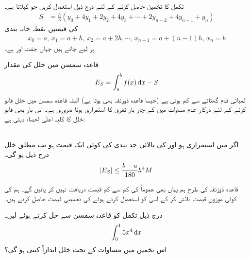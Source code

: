 \\
تکمل  کا تخمین حاصل کرنے کے لئے درج ذیل استعمال کریں جو   کہلاتا ہے۔ 
\begin{align}\label{مساوات_تکمل_قاعدہ_سمسن}
S&=\frac{h}{3}(y_0+4y_1+2y_2+4y_3+\cdots+2y_{n-2}+4y_{n-1}+y_n)
\end{align}
 کی قیمتیں نقطہ خانہ بندی
\begin{align*}
x_0=a,\, x_1=a+h,\, x_2=a+2h, \cdots, \, x_{n-1}=a+(n-1)h,\, x_n=b
\end{align*} 
پر لیے جاتے ہیں جہاں  جفت اور  ہے۔

قاعدہ سمسن میں خلل کی مقدار
\begin{align}\label{مساوات_تکمل_قاعدہ_سمسن_خلل_تعریف}
E_S=\int_a^bf(x)\dif x-S
\end{align} 
لمبائی قدم گھٹانے سے کم ہوتی ہے (جیسا قاعدہ ذوزنقہ بھی ہوتا ہے)  البتہ قاعدہ سمسن میں خلل قابو کرنے کے لئے درکار عدم مساوات میں  کے چار بار تفرق کا  استمراری ہونا ضروری ہے۔ اس بار بھی قابو خلل کا کلیہ اعلٰی احصاء دیتی ہے:

\\
اگر  میں  استمراری ہو اور  کی بالائی حد بندی کی کوئی ایک قیمت  ہو تب  مطلق خلل درج ذیل ہو گی۔
\begin{align}\label{مساوات_تکمل_قاعدہ_سمسن_خلل}
\abs{E_S}\le \frac{b-a}{180}h^4M
\end{align}

قاعدہ ذوزنقہ کی طرح ہم یہاں بھی عموماً  کی کم سے کم قیمت دریافت نہیں کر پائیں گے۔ ہم  کی کوئی موزوں قیمت تلاش کر کے اسی کو استعمال کرتے ہوئے  کی تخمینی قیمت حاصل کرتے ہیں۔

درج ذیل تکمل کو قاعدہ سمسن سے حل کرتے ہوئے  لیں۔
\begin{align*}
\int_0^1 5x^4\dif x
\end{align*}
اس تخمین میں مساوات  کے تحت خلل اندازاً کتنی ہو گی؟

